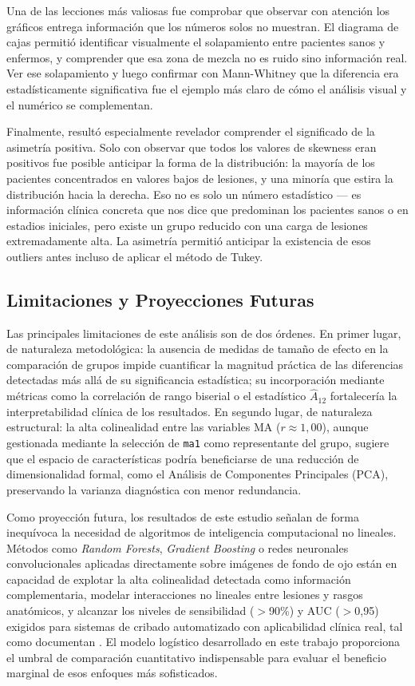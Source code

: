 Una de las lecciones más valiosas fue comprobar que observar con atención los gráficos entrega información que los números solos no muestran. El diagrama de cajas permitió identificar visualmente el solapamiento entre pacientes sanos y enfermos, y comprender que esa zona de mezcla no es ruido sino información real. Ver ese solapamiento y luego confirmar con Mann-Whitney que la diferencia era estadísticamente significativa fue el ejemplo más claro de cómo el análisis visual y el numérico se complementan.

Finalmente, resultó especialmente revelador comprender el significado de la asimetría positiva. Solo con observar que todos los valores de skewness eran positivos fue posible anticipar la forma de la distribución: la mayoría de los pacientes concentrados en valores bajos de lesiones, y una minoría que estira la distribución hacia la derecha. Eso no es solo un número estadístico — es información clínica concreta que nos dice que predominan los pacientes sanos o en estadios iniciales, pero existe un grupo reducido con una carga de lesiones extremadamente alta. La asimetría permitió anticipar la existencia de esos outliers antes incluso de aplicar el método de Tukey.

\subsection{Limitaciones y Proyecciones Futuras}

Las principales limitaciones de este análisis son de dos órdenes. En primer lugar, de
naturaleza metodológica: la ausencia de medidas de tamaño de efecto en la comparación
de grupos impide cuantificar la magnitud práctica de las diferencias detectadas más
allá de su significancia estadística; su incorporación mediante métricas como la
correlación de rango biserial o el estadístico $\hat{A}_{12}$ fortalecería la
interpretabilidad clínica de los resultados. En segundo lugar, de naturaleza estructural:
la alta colinealidad entre las variables MA ($r \approx 1{,}00$), aunque gestionada
mediante la selección de \texttt{ma1} como representante del grupo, sugiere que el
espacio de características podría beneficiarse de una reducción de dimensionalidad
formal, como el Análisis de Componentes Principales (PCA), preservando la varianza
diagnóstica con menor redundancia.

Como proyección futura, los resultados de este estudio señalan de forma inequívoca la
necesidad de algoritmos de inteligencia computacional no lineales. Métodos como
\textit{Random Forests}, \textit{Gradient Boosting} o redes neuronales convolucionales
aplicadas directamente sobre imágenes de fondo de ojo están en capacidad de explotar la
alta colinealidad detectada como información complementaria, modelar interacciones no
lineales entre lesiones y rasgos anatómicos, y alcanzar los niveles de sensibilidad
($>$90\%) y AUC ($>$0,95) exigidos para sistemas de cribado automatizado con
aplicabilidad clínica real, tal como documentan \textcite{casanova2014application}. El
modelo logístico desarrollado en este trabajo proporciona el umbral de comparación
cuantitativo indispensable para evaluar el beneficio marginal de esos enfoques más
sofisticados.
